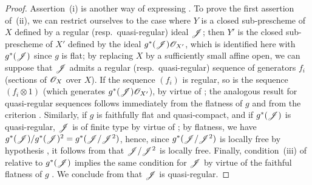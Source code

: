\begin{proof}
Assertion~(i) is another way of expressing .
To prove the first assertion of~(ii), we can restrict ourselves to the case where $Y$ is a closed sub-prescheme of $X$ defined by a regular (resp.\ quasi-regular) ideal $\mathscr{J}$; then $Y'$ is the closed sub-prescheme of $X'$ defined by the ideal $g^*(\mathscr{J})\mathscr{O}_{X'}$, which is identified here with $g^*(\mathscr{J})$ since $g$ is flat; by replacing $X$ by a sufficiently small affine open, we can suppose that $\mathscr{J}$ admits a regular (resp.\ quasi-regular) sequence of generators $f_i$ (sections of $\mathscr{O}_X$ over $X$).
If the sequence $(f_i)$ is regular, so is the sequence $(f_i\otimes 1)$ (which generates $g^*(\mathscr{J})\mathscr{O}_{X'}$), by virtue of ; the analogous result for quasi-regular sequences follows immediately from the flatness of $g$ and from the criterion .
Similarly, if $g$ is faithfully flat and quasi-compact, and if $g^*(\mathscr{J})$ is quasi-regular, $\mathscr{J}$ is of finite type by virtue of ; by flatness, we have $g^*(\mathscr{J})/g^*(\mathscr{J})^2=g^*(\mathscr{J}/\mathscr{J}^2)$, hence, since $g^*(\mathscr{J}/\mathscr{J}^2)$ is locally free by hypothesis , it follows from  that $\mathscr{J}/\mathscr{J}^2$ is locally free.
Finally, condition~(iii) of  relative to $g^*(\mathscr{J})$ implies the same condition for $\mathscr{J}$ by virtue of the faithful flatness of $g$ .
We conclude from  that $\mathscr{J}$ is quasi-regular.


\end{proof}
